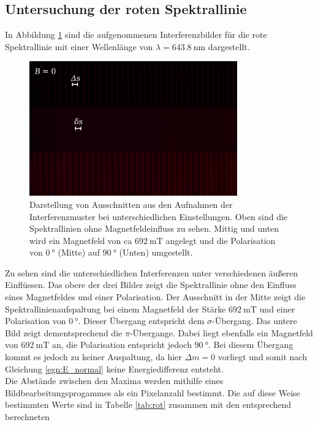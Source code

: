  \subsection{Untersuchung der roten Spektrallinie}
 In Abbildung \ref{fig:rot} sind die aufgenommenen Interferenzbilder für die rote Spektrallinie
 mit einer Wellenlänge von $\lambda = \SI{643.8}{\nano\meter}$ dargestellt.
 \begin{figure}[H]
     \centering
     \includegraphics[width=0.8\textwidth]{images/zebraplot_rot.jpg}
     \caption{Darstellung von Ausschnitten aus den Aufnahmen der Interferenzmuster bei unterschiedlichen
     Einstellungen. Oben sind die Spektrallinien ohne Magnetfeldeinfluss zu sehen. Mittig und unten
     wird ein Magnetfeld von ca $\SI{692}{\milli\tesla}$ angelegt und die Polarisation von $\SI{0}{\degree}$ (Mitte)
     auf $\SI{90}{\degree}$ (Unten) umgestellt.}
     \label{fig:rot}
 \end{figure} \noindent
 Zu sehen sind die unterschiedlichen Interferenzen unter verschiedenen äußeren Einflüssen. Das obere der drei
 Bilder zeigt die Spektrallinie ohne den Einfluss eines Magnetfeldes und einer Polarisation. Der Ausschnitt in
 der Mitte zeigt die Spektrallinienaufspaltung bei einem Magnetfeld der Stärke $\SI{692}{\milli\tesla}$ und
 einer Polarisation von $\SI{0}{\degree}$. Dieser Übergang entspricht dem $\sigma$-Übergang. Das untere
 Bild zeigt dementsprechend die $\pi$-Übergange. Dabei liegt ebenfalls ein Magnetfeld von $\SI{692}{\milli\tesla}$
 an, die Polarisation entspricht jedoch $\SI{90}{\degree}$. Bei diesem Übergang kommt es jedoch zu keiner
 Auspaltung, da hier $\Delta m = 0$ vorliegt und somit nach Gleichung \eqref{egn:E_normal} keine Energiedifferenz
 entsteht. \\
 Die Abstände zwischen den Maxima werden mithilfe eines Bildbearbeitungsprogammes als ein Pixelanzahl bestimmt.
 Die auf diese Weise bestimmten Werte sind in Tabelle \ref{tab:rot} zusammen mit den entsprechend berechneten
